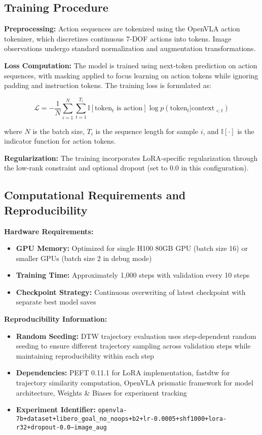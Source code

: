 \subsection{Training Procedure}

\textbf{Preprocessing:} Action sequences are tokenized using the OpenVLA action tokenizer, which discretizes continuous 7-DOF actions into tokens. Image observations undergo standard normalization and augmentation transformations.

\textbf{Loss Computation:} The model is trained using next-token prediction on action sequences, with masking applied to focus learning on action tokens while ignoring padding and instruction tokens. The training loss is formulated as:

\begin{equation}
\mathcal{L} = -\frac{1}{N} \sum_{i=1}^{N} \sum_{t=1}^{T_i} \mathbb{I}[\text{token}_t \text{ is action}] \log p(\text{token}_t | \text{context}_{<t})
\end{equation}

where $N$ is the batch size, $T_i$ is the sequence length for sample $i$, and $\mathbb{I}[\cdot]$ is the indicator function for action tokens.

\textbf{Regularization:} The training incorporates LoRA-specific regularization through the low-rank constraint and optional dropout (set to 0.0 in this configuration).

\subsection{Computational Requirements and Reproducibility}

\textbf{Hardware Requirements:}
\begin{itemize}
    \item \textbf{GPU Memory:} Optimized for single H100 80GB GPU (batch size 16) or smaller GPUs (batch size 2 in debug mode)
    \item \textbf{Training Time:} Approximately 1,000 steps with validation every 10 steps
    \item \textbf{Checkpoint Strategy:} Continuous overwriting of latest checkpoint with separate best model saves
\end{itemize}

\textbf{Reproducibility Information:}
\begin{itemize}
    \item \textbf{Random Seeding:} DTW trajectory evaluation uses step-dependent random seeding to ensure different trajectory sampling across validation steps while maintaining reproducibility within each step
    \item \textbf{Dependencies:} PEFT 0.11.1 for LoRA implementation, fastdtw for trajectory similarity computation, OpenVLA prismatic framework for model architecture, Weights \& Biases for experiment tracking
    \item \textbf{Experiment Identifier:} \texttt{openvla-7b+dataset+libero\_goal\_no\_noops+b2+lr-0.0005+shf1000+lora-r32+dropout-0.0--image\_aug}
\end{itemize}

